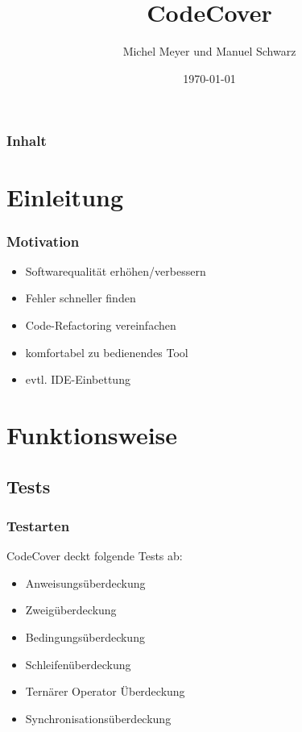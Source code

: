 \documentclass{beamer}
\begin{document}
  \title[CodeCover\hspace{105mm}\insertframenumber/\inserttotalframenumber]{CodeCover}
  \author{Michel Meyer und Manuel Schwarz}
  \date{\today}

  \begin{frame}
    \titlepage
  \end{frame}

  \begin{frame}
    \frametitle{Inhalt}
    \tableofcontents
  \end{frame}


  \section{Einleitung}
  \begin{frame}
    \frametitle{Motivation}
    \begin{itemize}[<+->]
      \item Softwarequalität erhöhen/verbessern
      \item Fehler schneller finden
      \item Code-Refactoring vereinfachen
      \item komfortabel zu bedienendes Tool
      \item evtl. IDE-Einbettung
    \end{itemize}
  \end{frame}

  \section{Funktionsweise}
  \subsection{Tests}
  \begin{frame}\frametitle{Testarten}
  CodeCover deckt folgende Tests ab:
    \begin{itemize}[<+->]
      \item Anweisungsüberdeckung
      \item Zweigüberdeckung
      \item Bedingungsüberdeckung
      \item Schleifenüberdeckung
      \item Ternärer Operator Überdeckung
      \item Synchronisationsüberdeckung
    \end{itemize}
  \end{frame}
\end{document}
